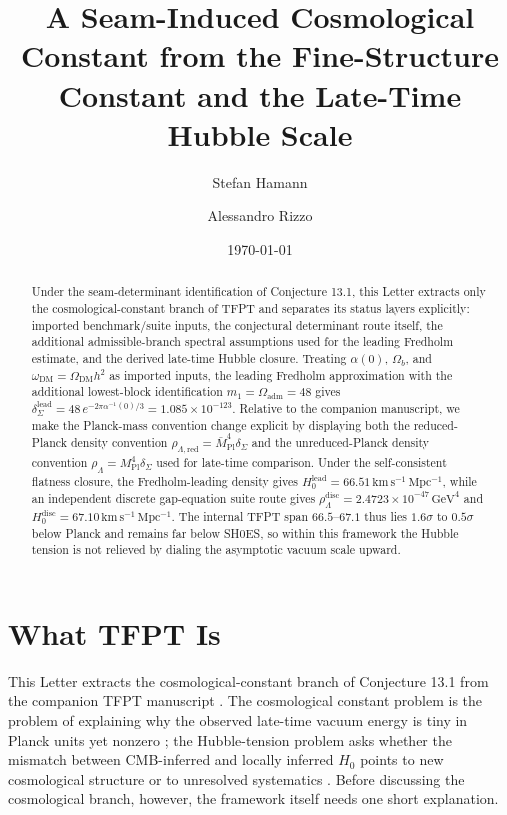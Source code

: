 \documentclass[aps,prl,reprint,superscriptaddress,longbibliography,nofootinbib,floatfix]{revtex4-2}
\newcommand{\Seam}{\Sigma}
\begin{document}
\title{A Seam-Induced Cosmological Constant from the Fine-Structure Constant and the Late-Time Hubble Scale}
\author{Stefan Hamann}
\noaffiliation
\author{Alessandro Rizzo}
\noaffiliation
\date{\today}

\begin{abstract}
Under the seam-determinant identification of Conjecture 13.1, this Letter extracts only the cosmological-constant branch of TFPT and separates its status layers explicitly: imported benchmark/suite inputs, the conjectural determinant route itself, the additional admissible-branch spectral assumptions used for the leading Fredholm estimate, and the derived late-time Hubble closure. Treating $\alpha(0)$, $\Omega_b$, and $\omega_{\mathrm{DM}}=\Omega_{\mathrm{DM}}h^2$ as imported inputs, the leading Fredholm approximation with the additional lowest-block identification $m_1=\Omega_{\mathrm{adm}}=48$ gives $\delta_{\Seam}^{\mathrm{lead}}=48\,e^{-2\pi\alpha^{-1}(0)/3}=1.085\times10^{-123}$. Relative to the companion manuscript, we make the Planck-mass convention change explicit by displaying both the reduced-Planck density convention $\rho_{\Lambda,\mathrm{red}}=\bar M_{\mathrm{Pl}}^4\delta_{\Seam}$ and the unreduced-Planck density convention $\rho_\Lambda=M_{\mathrm{Pl}}^4\delta_{\Seam}$ used for late-time comparison. Under the self-consistent flatness closure, the Fredholm-leading density gives $H_0^{\mathrm{lead}}=66.51\,\mathrm{km\,s^{-1}\,Mpc^{-1}}$, while an independent discrete gap-equation suite route gives $\rho_\Lambda^{\mathrm{disc}}=2.4723\times10^{-47}\,\mathrm{GeV}^4$ and $H_0^{\mathrm{disc}}=67.10\,\mathrm{km\,s^{-1}\,Mpc^{-1}}$. The internal TFPT span $66.5$--$67.1$ thus lies $1.6\sigma$ to $0.5\sigma$ below Planck and remains far below SH0ES, so within this framework the Hubble tension is not relieved by dialing the asymptotic vacuum scale upward.
\end{abstract}

\maketitle

\section{What TFPT Is}

This Letter extracts the cosmological-constant branch of Conjecture 13.1 from the companion TFPT manuscript \cite{tfpt31}. The cosmological constant problem is the problem of explaining why the observed late-time vacuum energy is tiny in Planck units yet nonzero \cite{einstein1917,weinberg1989}; the Hubble-tension problem asks whether the mismatch between CMB-inferred and locally inferred $H_0$ points to new cosmological structure or to unresolved systematics \cite{planck2018,riess2022}. Before discussing the cosmological branch, however, the framework itself needs one short explanation.
\end{document}
